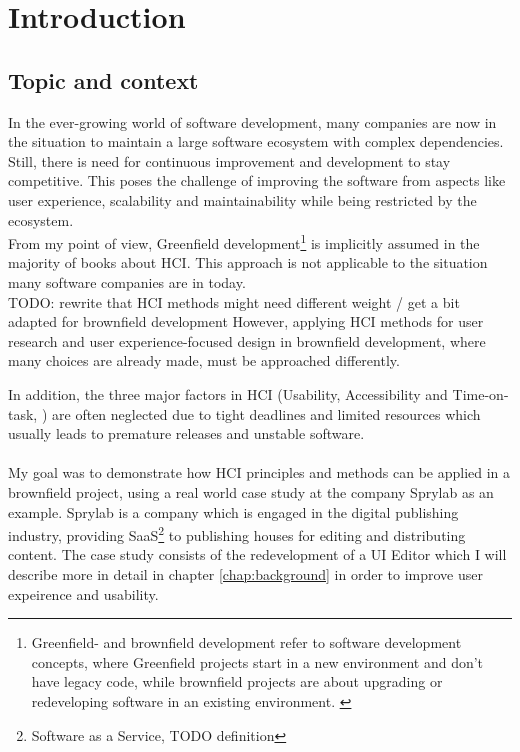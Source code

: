 %
\chapter{Introduction}
\label{chap:introduction}

\section{Topic and context}

In the ever-growing world of software development, many companies are now in the situation to maintain a large software ecosystem with complex dependencies.
Still, there is need for continuous improvement and development to stay competitive.
This poses the challenge of improving the software from aspects like user experience, scalability and maintainability while being restricted by the ecosystem.
\\
From my point of view, Greenfield development\footnote{Greenfield- and brownfield development refer to software development concepts, where Greenfield projects start in a new environment and don't have legacy code, while brownfield projects are about upgrading or redeveloping software in an existing environment. \cite{JohnAdamsIt:Greenfield}} is implicitly assumed in the majority of books about HCI.
This approach is not applicable to the situation many software companies are in today.
\\
TODO: rewrite that HCI methods might need different weight / get a bit adapted for brownfield development
However, applying HCI methods for user research and user experience-focused design in brownfield development, where many choices are already made, must be approached differently.

In addition, the three major factors in HCI (Usability, Accessibility and Time-on-task, \Cite[pp. 38-40]{LearnHCI:2020ys}) are often neglected due to tight deadlines and limited resources which usually leads to premature releases and unstable software.
\\\\
My goal was to demonstrate how HCI principles and methods can be applied in a brownfield project, using a real world case study at the company Sprylab as an example.
Sprylab is a company which is engaged in the digital publishing industry, providing SaaS\footnote{Software as a Service, TODO definition} to publishing houses for editing and distributing content.
The case study consists of the redevelopment of a UI Editor which I will describe more in detail in chapter \ref{chap:background} in order to improve user expeirence and usability.

